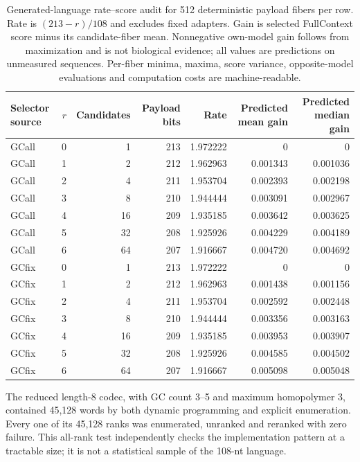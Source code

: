 \documentclass[10pt]{article}
\begin{document}
\begin{table}[H]
\centering
\small
\begin{tabular}{lrrrrrr}
\toprule
Selector source & $r$ & Candidates & Payload bits & Rate & Predicted mean gain & Predicted median gain \\
\midrule
GCall & 0 & 1 & 213 & 1.972222 & 0 & 0 \\
GCall & 1 & 2 & 212 & 1.962963 & 0.001343 & 0.001036 \\
GCall & 2 & 4 & 211 & 1.953704 & 0.002393 & 0.002198 \\
GCall & 3 & 8 & 210 & 1.944444 & 0.003091 & 0.002967 \\
GCall & 4 & 16 & 209 & 1.935185 & 0.003642 & 0.003625 \\
GCall & 5 & 32 & 208 & 1.925926 & 0.004229 & 0.004189 \\
GCall & 6 & 64 & 207 & 1.916667 & 0.004720 & 0.004692 \\
GCfix & 0 & 1 & 213 & 1.972222 & 0 & 0 \\
GCfix & 1 & 2 & 212 & 1.962963 & 0.001438 & 0.001156 \\
GCfix & 2 & 4 & 211 & 1.953704 & 0.002592 & 0.002448 \\
GCfix & 3 & 8 & 210 & 1.944444 & 0.003356 & 0.003163 \\
GCfix & 4 & 16 & 209 & 1.935185 & 0.003953 & 0.003907 \\
GCfix & 5 & 32 & 208 & 1.925926 & 0.004585 & 0.004502 \\
GCfix & 6 & 64 & 207 & 1.916667 & 0.005098 & 0.005048 \\
\bottomrule
\end{tabular}
\caption{Generated-language rate--score audit for 512 deterministic payload fibers per row. Rate is $(213-r)/108$ and excludes fixed adapters. Gain is selected FullContext score minus its candidate-fiber mean. Nonnegative own-model gain follows from maximization and is not biological evidence; all values are predictions on unmeasured sequences. Per-fiber minima, maxima, score variance, opposite-model evaluations and computation costs are machine-readable.}
\label{tab:s-generated}
\end{table}

The reduced length-8 codec, with GC count 3--5 and maximum homopolymer 3, contained 45,128 words by both dynamic programming and explicit enumeration. Every one of its 45,128 ranks was enumerated, unranked and reranked with zero failure. This all-rank test independently checks the implementation pattern at a tractable size; it is not a statistical sample of the 108-nt language.
\end{document}
